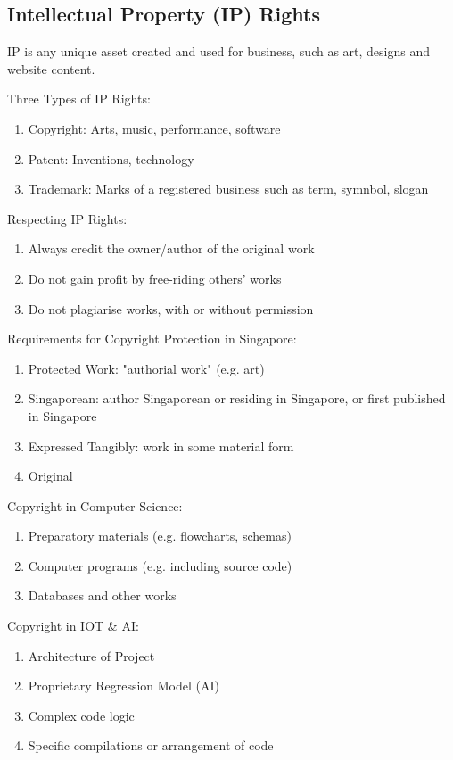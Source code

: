 \documentclass[12pt, a4paper]{article}
\begin{document}
\begin{multicols*}{3}
\section{Intellectual Property (IP) Rights}
IP is any unique asset created and used for business, such as art, designs and website content.

Three Types of IP Rights:
\begin{enumerate}[\roman*.]
  \item Copyright: Arts, music, performance, software
  \item Patent: Inventions, technology
  \item Trademark: Marks of a registered business such as term, symnbol, slogan
\end{enumerate}

Respecting IP Rights:
\begin{enumerate}[\roman*.]
  \item Always credit the owner/author of the original work
  \item Do not gain profit by free-riding others' works
  \item Do not plagiarise works, with or without permission
\end{enumerate}

Requirements for Copyright Protection in Singapore:
\begin{enumerate}[\roman*.]
  \item Protected Work: "authorial work" (e.g. art) 
  \item Singaporean: author Singaporean or residing in Singapore, or first published in Singapore
  \item Expressed Tangibly: work in some material form 
  \item Original
\end{enumerate}

Copyright in Computer Science:
\begin{enumerate}[\roman*.]
  \item Preparatory materials (e.g. flowcharts, schemas)
  \item Computer programs (e.g. including source code)
  \item Databases and other works
\end{enumerate}

Copyright in IOT \& AI:
\begin{enumerate}[\roman*.]
  \item Architecture of Project 
  \item Proprietary Regression Model (AI)
  \item Complex code logic
  \item Specific compilations or arrangement of code
\end{enumerate}


\end{multicols*}
\end{document}
